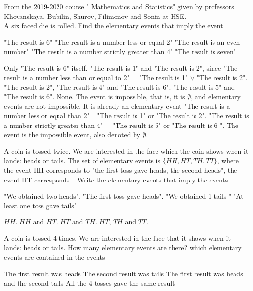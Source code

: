 \begin{ExerciseList}
	\Exercise
       From the 2019-2020 course " Mathematics and Statistics" given by  professors 
       Khovanskaya, Bubilin, Shurov, Filimonov and Sonin at HSE.\\ 
       A six faced die is rolled. Find the elementary events that imply the event
    
      \Question "The result is 6"
      \Question "The result is a number less or equal 2"
      \Question "The result is an even number"
      \Question "The result is a number strictly greater than 4"
      \Question "The result is seven"  
    
 	\Answer
	\Question Only "The result is 6" itself. 
	\Question "The result is 1" and "The result is 2", since "The result is a number less than or equal to 2" = "The result is 1" $\vee$ "The result is 2". 
	\Question "The result is 2", "The result is 4" and "The result is 6". 
	\Question "The result is 5" and "The result is 6". 
	\Question None. The event is impossible, that is, it is $\emptyset$, and elementary events are not impossible.	
	\Question It is already an elementary event 
	\Question "The result is a number less or equal than 2"= "The result is 1" or "The result is 2". 
	\Question "The result is a number strictly greater than 4" = "The result is 5" or "The result is 6 ". 
	\Question The event is the impossible event, also denoted by $\emptyset $. 

	\Exercise  A coin is tossed twice. We are interested in the face which the coin shows when it lands: heads or tails. The set of elementary events is $\{ HH, HT,TH,TT\}$, where the event HH corresponds to "the first toss gave heads, the second heads", the event HT corresponds... Write the elementary events that imply the events
   
         \Question "We obtained two heads".
         \Question "The first toss gave heads".
         \Question "We obtained 1 tails "
         \Question "At least one toss gave tails"
        

	\Answer 
	\Question $HH$. 
	\Question $HH$ and $HT$. 
	\Question $HT$ and $TH$. 
	\Question $HT$, $TH$ and $TT$.
    	
	\Exercise A coin is tossed 4 times. We are interested in the face that it shows when it lands: heads or tails. How many elementary events are there? which elementary events are contained in the events 
    
    
      \Question The first result was heads
      \Question The second result was tails
      \Question The first result was heads and the second tails 
      \Question All the 4 tosses gave the same result
    

\end{ExerciseList}

